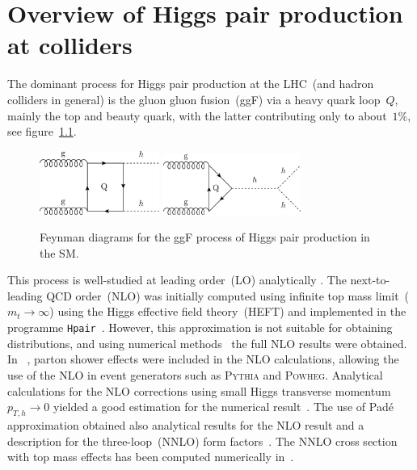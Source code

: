 
\chapter{ Overview of Higgs pair production at colliders }\label{chap:overviewDiHiggs}
The dominant process for Higgs pair production at the LHC~(and hadron colliders in general) is the gluon gluon fusion~(ggF) via a heavy quark loop~$Q$, mainly the top and beauty quark, with the latter contributing only to about~$1\%$, see figure~\ref{fig_ggf_sm}.
%
\begin{figure}[!htpb]
	\centering
	\includegraphics[width = 0.35\textwidth]{./figures/ggfbox}
	\hspace{0.3 cm}
	\includegraphics[width = 0.4\textwidth]{./figures/ggftri}
	\caption{Feynman diagrams for the ggF process of Higgs pair production in the SM.} %
	\label{fig_ggf_sm}
\end{figure}
%
This process is well-studied at leading order~(LO) analytically \cite{EBOLI1987269,GLOVER1988282,DICUS1988457,Plehn:1996wb}. The next-to-leading  QCD order~(NLO)   was initially computed using infinite top mass limit~($m_t \to \infty$) using the Higgs effective field theory~(HEFT) and implemented in the programme \texttt{Hpair}~\cite{Dawson:1998py}. However, this approximation is not suitable for obtaining distributions, and using numerical methods~\cite{Borowka:2016ypz,Borowka:2016ehy,Baglio:2018lrj} the full NLO results were obtained. In ~\cite{Heinrich:2019bkc}, parton shower effects were included in the NLO calculations, allowing the use of the NLO in event generators such as \textsc{Pythia} and \textsc{Powheg}. Analytical calculations for the NLO corrections using small Higgs transverse momentum~$p_{T,h} \to 0$ yielded a good estimation for the numerical result~\cite{Bonciani:2018omm}. The use of Pad\'e approximation obtained also analytical results for the NLO result and a description for the three-loop~(NNLO) form factors~\cite{Davies:2019nhm}. The NNLO cross section with top mass effects has been computed numerically in~\cite{Grazzini:2018bsd}.
